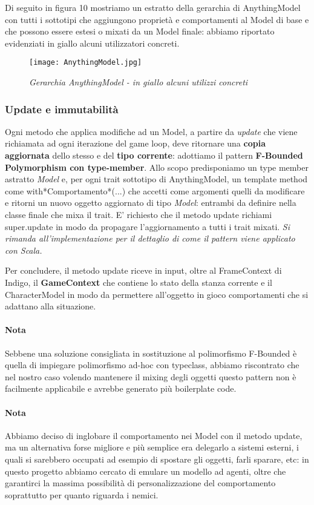 Di seguito in figura 10 mostriamo un estratto della gerarchia di AnythingModel con tutti i sottotipi che aggiungono proprietà e comportamenti al Model di base e che possono essere estesi o mixati da un Model finale: abbiamo riportato evidenziati in giallo alcuni utilizzatori concreti.

\begin{figure}[!hbt]
    \centering
    \texttt{[image: AnythingModel.jpg]}
    \caption{\textit{Gerarchia AnythingModel - in giallo alcuni utilizzi concreti}} 
\end{figure}

\subsubsection{Update e immutabilità}

Ogni metodo che applica modifiche ad un Model, a partire da \textit{update} che viene richiamata ad ogni iterazione del game loop, deve ritornare una \textbf{copia aggiornata} dello stesso e del \textbf{tipo corrente}: adottiamo il pattern \textbf{F-Bounded Polymorphism con type-member}. 
Allo scopo predisponiamo un type member astratto \textit{Model} e, per ogni trait sottotipo di AnythingModel, un template method come with*Comportamento*(...) che accetti come argomenti quelli da modificare e ritorni un nuovo oggetto aggiornato di tipo \textit{Model}: entrambi da definire nella classe finale che mixa il trait.
E' richiesto che il metodo update richiami super.update in modo da propagare l'aggiornamento a tutti i trait mixati.
\textit{Si rimanda all'implementazione per il dettaglio di come il pattern viene applicato con Scala.}

Per concludere, il metodo update riceve in input, oltre al FrameContext di Indigo, il \textbf{GameContext} che contiene lo stato della stanza corrente e il CharacterModel in modo da permettere all'oggetto in gioco comportamenti che si adattano alla situazione.

\paragraph{Nota} Sebbene una soluzione consigliata in sostituzione al polimorfismo F-Bounded è quella di impiegare polimorfismo ad-hoc con typeclass, abbiamo riscontrato che nel nostro caso volendo mantenere il mixing degli oggetti questo pattern non è facilmente applicabile e avrebbe generato più boilerplate code.

\paragraph{Nota}
Abbiamo deciso di inglobare il comportamento nei Model con il metodo update, ma un alternativa forse migliore e più semplice era delegarlo a sistemi esterni, i quali si sarebbero occupati ad esempio di spostare gli oggetti, farli sparare, etc: in questo progetto abbiamo cercato di emulare un modello ad agenti, oltre che garantirci la massima possibilità di personalizzazione del comportamento soprattutto per quanto riguarda i nemici. 

